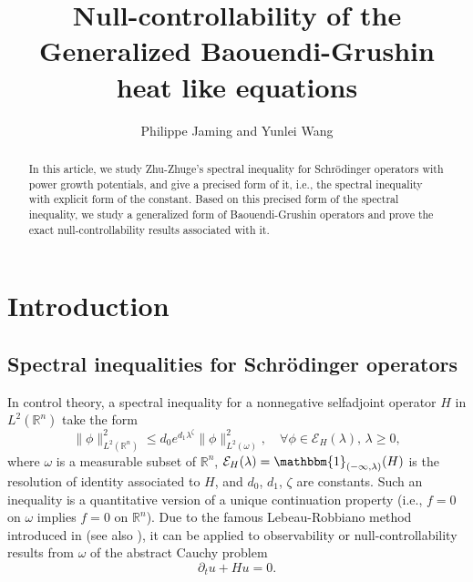 \documentclass{article}
\numberwithin{equation}{section}
\newcommand\R{\ensuremath{\mathbb{R}}}
\numberwithin{equation}{section}
\theoremstyle{definition}
\begin{document}
\title{Null-controllability of the Generalized Baouendi-Grushin heat like equations}

\author{Philippe Jaming and Yunlei Wang}


\maketitle


\begin{abstract}
	In this article, we study Zhu-Zhuge's spectral inequality for Schrödinger operators with power growth potentials, and give a precised form of it, i.e., the spectral inequality with explicit form of the constant. Based on this precised form of the spectral inequality, we study a generalized form of Baouendi-Grushin operators and prove the exact null-controllability results associated with it.
\end{abstract}
\tableofcontents
\section{Introduction}
\subsection{Spectral inequalities for Schrödinger operators}
In control theory, a spectral inequality for a nonnegative selfadjoint operator $H$ in $L^2(\R^{n})$ take the form
\begin{equation}\label{1a}
\|\phi\|_{L^2(\R^{n})}^2\le d_0 e^{d_1 \lambda^{ \zeta}}\|\phi\|^2_{L^2(\omega)},\quad \forall \phi \in \mathcal{E}_H(\lambda),\,\lambda\ge 0,
\end{equation}
where $\omega$ is a measurable subset of $\R^{n}$, $\mathcal{E}_H(\lambda)=\mathbbm{1}_{(-\infty,\lambda)}(H)$ is the resolution of identity associated to $H$, and $d_0$, $d_1$, $\zeta$ are constants. Such an inequality is a quantitative version of a unique continuation property (i.e., $f=0$ on $\omega$ implies $f=0$ on $\R^{n}$). Due to the famous Lebeau-Robbiano method introduced in \cite{lebeau1995controle} (see also \cite{tenenbaum2011null,beauchard2018null,nakic2020sharp,gallaun2020sufficient}), it can be applied to observability or null-controllability results from $\omega$ of the abstract Cauchy problem
\begin{equation}\label{1.2a}
	\partial_t u+Hu=0.
\end{equation}
\end{document}
